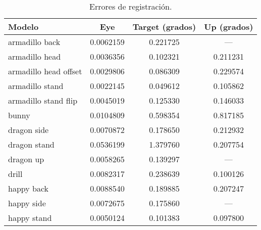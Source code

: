 \begin{table}
	\centering
	\begin{tabular}{l*{3}{c}}
		\toprule                                                                  
		Modelo                   &    Eye          &    Target (grados)        &    Up (grados)\\
		\midrule
		armadillo back          &     0.0062159   &   0.221725     &    ---\\        
		armadillo head          &     0.0036356  &    0.102321     &    0.211231\\   
		armadillo head offset   &     0.0029806  &    0.086309     &    0.229574\\   
		armadillo stand         &     0.0022145  &    0.049612     &    0.105862\\   
		armadillo stand flip    &     0.0045019  &    0.125330     &    0.146033\\   
		\midrule
		bunny                   &     0.0104809   &   0.598354     &    0.817185\\   
		\midrule
		dragon side             &     0.0070872  &    0.178650     &    0.212932\\   
		dragon stand            &     0.0536199   &   1.379760     &    0.207754\\   
		dragon up               &     0.0058265  &    0.139297     &    ---\\        
		\midrule
		drill                   &     0.0082317  &    0.238639     &    0.100126\\   
		\midrule
		happy back              &     0.0088540  &    0.189885     &    0.207247\\   
		happy side              &     0.0072675   &   0.175860     &    ---\\        
		happy stand             &     0.0050124  &    0.101383     &    0.097800\\  
		\bottomrule                                                               
	\end{tabular}
	\caption[Errores de registración]{\label{tab:reg_error}Errores de registración.
	}
\end{table}
